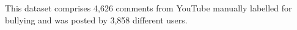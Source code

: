 This dataset comprises 4,626 comments from YouTube manually labelled for bullying and was posted by 3,858 different users.